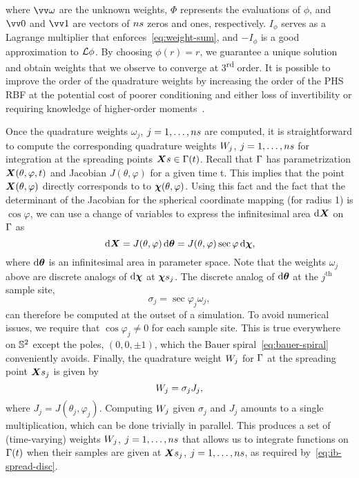 where $\arr{\omega}$ are the unknown weights, $\Phi$ represents the evaluations of $\phi$, and $\arr{0}$ and
$\arr{1}$ are vectors of $\sample\cardinality$ zeros and ones, respectively. $I_{\phi}$ serves as a Lagrange
multiplier that enforces~\eqref{eq:weight-sum}, and $-I_\phi$ is a good approximation to $\mathcal{L}\phi$. By choosing
$\phi(r) = r$, we guarantee a unique solution and obtain weights that we observe to converge at
3\textsuperscript{rd} order. It is possible to improve the order of the quadrature weights by increasing the order
of the PHS RBF at the potential cost of poorer conditioning and either loss of invertibility or requiring
knowledge of higher-order moments~\cite{Fuselier:2013coba}.

Once the quadrature weights $\omega_j$, $j=1, \ldots, \sample\cardinality$ are computed, it is straightforward to
compute the corresponding quadrature weights $\weight[j]$, $j=1, \ldots, \sample\cardinality$ for integration at
the spreading points $\sample\X \in \interface(t)$. Recall that $\Gamma$ has parametrization
$\boldsymbol{X}(\theta, \varphi, t)$ and Jacobian $J(\theta, \varphi)$ for a given time t. This implies that the point
$\boldsymbol{X}(\theta, \varphi)$ directly corresponds to to $\boldsymbol{\chi}(\theta, \varphi)$. Using this fact and the fact that the
determinant of the Jacobian for the spherical coordinate mapping (for radius 1) is $\cos\varphi$, we can use a
change of variables to express the infinitesimal area $\d\X$ on $\Gamma$ as
\begin{equation}\label{eq:quad-cov}
    \d\X
    = J(\theta, \varphi)\d\qs
    = J(\theta, \varphi)\sec\varphi\d\Xp,
\end{equation}
where $\d\qs$ is an infinitesimal area in parameter space. Note that the weights $\omega_j$ above are discrete
analogs of $\d\Xp$ at $\Xpsj$. The discrete analog of $\d\qs$ at the $j^\text{th}$ sample site,
\begin{equation*}
    \sigma_j=\sec\varphi_j\omega_j,
\end{equation*}
can therefore be computed at the outset of a simulation. To avoid numerical issues, we require that
$\cos\varphi_j \neq 0$ for each sample site. This is true everywhere on $\mathbb{S}^2$ except the poles,
$(0, 0, \pm1)$, which the Bauer spiral~\eqref{eq:bauer-spiral} conveniently avoids. Finally, the quadrature weight
$\weight[j]$ for $\Gamma$ at the spreading point $\Xsj$ is given by
\begin{equation}
    \weight[j] = \sigma_j J_j,
\end{equation}
where $J_j = J(\theta_j, \varphi_j)$. Computing $\weight[j]$ given $\sigma_j$ and $J_j$ amounts to a single
multiplication, which can be done trivially in parallel. This produces a set of (time-varying) weights
$\weight[j]$, $j=1, \ldots, \sample\cardinality$ that allows us to integrate functions on $\Gamma(t)$ when
their samples are given at $\Xsj$, $j=1, \ldots, \sample\cardinality$, as required by~\eqref{eq:ib-spread-disc}.
